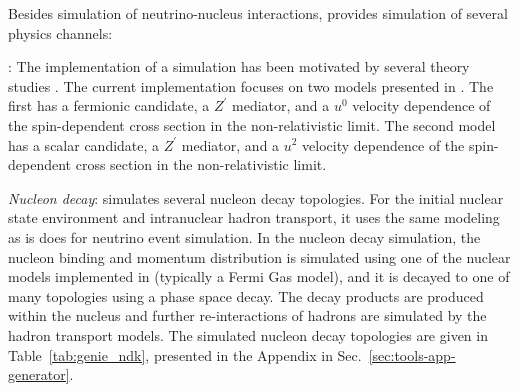 %
%
%

Besides simulation of neutrino-nucleus interactions,  provides simulation of several  physics channels:

\textit{}: The implementation of a   simulation has been motivated by several theory studies \cite{Agashe:2014yua, Berger:2014sqa, Kong:2014mia, Cherry:2015oca, Kopp:2015bfa, Necib:2016aez, Alhazmi:2016qcs, Kim:2016zjx}. The current implementation focuses on two models presented in  \cite{Berger:2014sqa}. The first has a fermionic  candidate, a $Z^\prime$ mediator, and a $u^0$ velocity dependence of the spin-dependent cross section in the non-relativistic limit. The second model has a scalar  candidate, a $Z^\prime$ mediator, and a $u^2$ velocity dependence of the spin-dependent cross section in the non-relativistic limit.

\textit{Nucleon decay}:  simulates several nucleon decay topologies. For the initial nuclear state environment and intranuclear hadron transport, it uses the same modeling as is does for neutrino event simulation. In the nucleon decay simulation, the nucleon binding and momentum distribution is simulated using one of the nuclear models implemented in  (typically a Fermi Gas model), and it is decayed to one of many topologies using a phase space decay. The decay products are produced within the nucleus and further re-interactions of hadrons are simulated by the  hadron transport models. The simulated nucleon decay topologies are given in Table~\ref{tab:genie_ndk}, presented in the Appendix
in Sec.~\ref{sec:tools-app-generator}.

